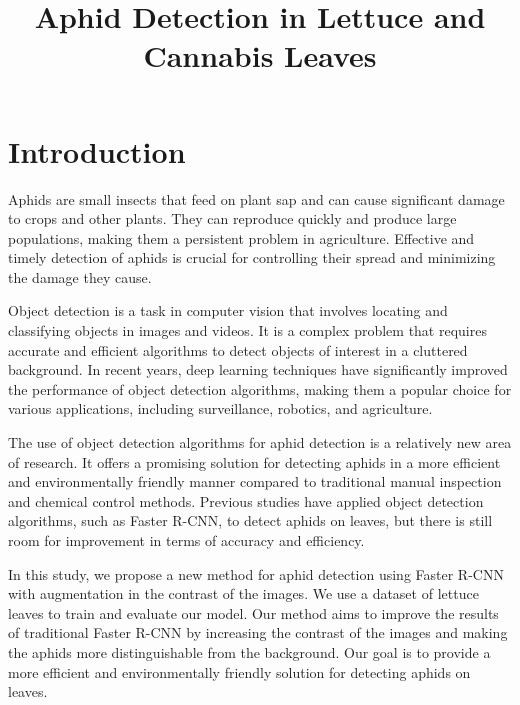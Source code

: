 \documentclass{article}
\title{Aphid Detection in Lettuce and Cannabis Leaves}
\begin{document}
\maketitle

\section{Introduction}
Aphids are small insects that feed on plant sap and can cause significant damage to crops and other plants. 
They can reproduce quickly and produce large populations, making them a persistent problem in agriculture. 
Effective and timely detection of aphids is crucial for controlling their spread and minimizing the damage 
they cause.


Object detection is a task in computer vision that involves locating and classifying objects in images and videos.
It is a complex problem that requires accurate and efficient algorithms to detect objects of interest in a 
cluttered background. In recent years, deep learning techniques have significantly improved the performance 
of object detection algorithms, making them a popular choice for various applications, 
including surveillance, robotics, and agriculture.


The use of object detection algorithms for aphid detection is a relatively new area of research. 
It offers a promising solution for detecting aphids in a more efficient and environmentally friendly 
manner compared to traditional manual inspection and chemical control methods. 
Previous studies have applied object detection algorithms, such as Faster R-CNN, 
to detect aphids on leaves, but there is still room for improvement in terms of accuracy and efficiency.


In this study, we propose a new method for aphid detection using Faster R-CNN with augmentation in the 
contrast of the images. We use a dataset of lettuce leaves to train and evaluate our model. 
Our method aims to improve the results of traditional Faster R-CNN by increasing the contrast of the 
images and making the aphids more distinguishable from the background. Our goal is to provide a 
more efficient and environmentally friendly solution for detecting aphids on leaves.
\end{document}
